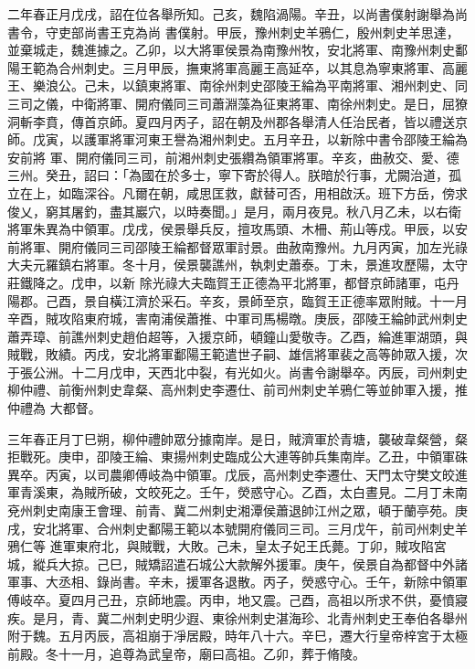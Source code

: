 \begin{pinyinscope}
 二年春正月戊戌，詔在位各舉所知。己亥，魏陷渦陽。辛丑，以尚書僕射謝舉為尚書令，守吏部尚書王克為尚
 書僕射。甲辰，豫州刺史羊鴉仁，殷州刺史羊思達，並棄城走，魏進據之。乙卯，以大將軍侯景為南豫州牧，安北將軍、南豫州刺史鄱陽王範為合州刺史。三月甲辰，撫東將軍高麗王高延卒，以其息為寧東將軍、高麗王、樂浪公。己未，以鎮東將軍、南徐州刺史邵陵王綸為平南將軍、湘州刺史、同三司之儀，中衛將軍、開府儀同三司蕭淵藻為征東將軍、南徐州刺史。是日，屈獠洞斬李賁，傳首京師。夏四月丙子，詔在朝及州郡各舉清人任治民者，皆以禮送京師。戊寅，以護軍將軍河東王譽為湘州刺史。五月辛丑，以新除中書令邵陵王綸為安前將
 軍、開府儀同三司，前湘州刺史張纘為領軍將軍。辛亥，曲赦交、愛、德三州。癸丑，詔曰：「為國在於多士，寧下寄於得人。朕暗於行事，尤闕治道，孤立在上，如臨深谷。凡爾在朝，咸思匡救，獻替可否，用相啟沃。班下方岳，傍求俊乂，窮其屠釣，盡其巖穴，以時奏聞。」是月，兩月夜見。秋八月乙未，以右衛將軍朱異為中領軍。戊戌，侯景舉兵反，擅攻馬頭、木柵、荊山等戍。甲辰，以安前將軍、開府儀同三司邵陵王綸都督眾軍討景。曲赦南豫州。九月丙寅，加左光祿大夫元羅鎮右將軍。冬十月，侯景襲譙州，執刺史蕭泰。丁未，景進攻歷陽，太守莊鐵降之。戊申，以新
 除光祿大夫臨賀王正德為平北將軍，都督京師諸軍，屯丹陽郡。己酉，景自橫江濟於采石。辛亥，景師至京，臨賀王正德率眾附賊。十一月辛酉，賊攻陷東府城，害南浦侯蕭推、中軍司馬楊暾。庚辰，邵陵王綸帥武州刺史蕭弄璋、前譙州刺史趙伯超等，入援京師，頓鐘山愛敬寺。乙酉，綸進軍湖頭，與賊戰，敗績。丙戌，安北將軍鄱陽王範遣世子嗣、雄信將軍裴之高等帥眾入援，次于張公洲。十二月戊申，天西北中裂，有光如火。尚書令謝舉卒。丙辰，司州刺史柳仲禮、前衡州刺史韋粲、高州刺史李遷仕、前司州刺史羊鴉仁等並帥軍入援，推仲禮為
 大都督。



 三年春正月丁巳朔，柳仲禮帥眾分據南岸。是日，賊濟軍於青塘，襲破韋粲營，粲拒戰死。庚申，卲陵王綸、東揚州刺史臨成公大連等帥兵集南岸。乙丑，中領軍硃異卒。丙寅，以司農卿傅岐為中領軍。戊辰，高州刺史李遷仕、天門太守樊文皎進軍青溪東，為賊所破，文皎死之。壬午，熒惑守心。乙酉，太白晝見。二月丁未南兗州刺史南康王會理、前青、冀二州刺史湘潭侯蕭退帥江州之眾，頓于蘭亭苑。庚戌，安北將軍、合州刺史鄱陽王範以本號開府儀同三司。三月戊午，前司州刺史羊鴉仁等
 進軍東府北，與賊戰，大敗。己未，皇太子妃王氏薨。丁卯，賊攻陷宮城，縱兵大掠。己巳，賊矯詔遣石城公大款解外援軍。庚午，侯景自為都督中外諸軍事、大丞相、錄尚書。辛未，援軍各退散。丙子，熒惑守心。壬午，新除中領軍傅岐卒。夏四月己丑，京師地震。丙申，地又震。己酉，高祖以所求不供，憂憤寢疾。是月，青、冀二州刺史明少遐、東徐州刺史湛海珍、北青州刺史王奉伯各舉州附于魏。五月丙辰，高祖崩于凈居殿，時年八十六。辛巳，遷大行皇帝梓宮于太極前殿。冬十一月，追尊為武皇帝，廟曰高祖。乙卯，葬于脩陵。




\end{pinyinscope}
